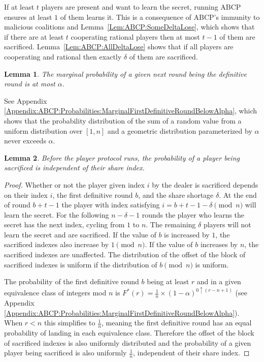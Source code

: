 \documentclass[12pt]{dalcsthesis}
\newtheorem{lemma}{Lemma}
\begin{document}
If at least $t$ players are present and want to learn the secret, running ABCP ensures at least $1$ of them learns it. This is a consequence of ABCP's immunity to malicious coalitions and Lemma~\ref{Lem:ABCP:SomeDeltaLose}, which shows that if there are at least $t$ cooperating rational players then at most $t-1$ of them are sacrificed. Lemma~\ref{Lem:ABCP:AllDeltaLose} shows that if all players are cooperating and rational then exactly $\delta$ of them are sacrificed.

\begin{lemma}\label{Lem:ABPC:MarginalAtMostAlpha}The marginal probability of a given next round being the definitive round is at most $\alpha$.\end{lemma}
See Appendix \ref{Appendix:ABCP:Probabilities:MarginalFirstDefinitiveRoundBelowAlpha}, which shows that the probability distribution of the sum of a random value from a uniform distribution over $[1,n]$ and a geometric distribution parameterized by $\alpha$ never exceeds $\alpha$.

\begin{lemma}\label{Lem:ABCP:FairSacrificeBefore}Before the player protocol runs, the probability of a player being sacrificed is independent of their share index.\end{lemma}
\begin{proof}
Whether or not the player given index $i$ by the dealer is sacrificed depends on their index $i$, the first definitive round $b$, and the share shortage $\delta$. At the end of round $b+t-1$ the player with index satisfying $i = b+t-1-\delta \pmod{n}$ will learn the secret. For the following $n-\delta-1$ rounds the player who learns the secret has the next index, cycling from $1$ to $n$. The remaining $\delta$ players will not learn the secret and are sacrificed. If the value of $b$ is increased by $1$, the sacrificed indexes also increase by $1 \pmod{n}$. If the value of $b$ increases by $n$, the sacrificed indexes are unaffected. The distribution of the offset of the block of sacrificed indexes is uniform if the distribution of $b \pmod{n}$ is uniform.

The probability of the first definitive round $b$ being at least $r$ and in a given equivalence class of integers mod $n$ is $F^{*}(r) = \frac{1}{n} \times (1-\alpha)^{0 \uparrow (r - n + 1)}$ (see Appendix \ref{Appendix:ABCP:Probabilities:MarginalFirstDefinitiveRoundBelowAlpha}). When $r < n$ this simplifies to $\frac{1}{n}$, meaning the first definitive round has an equal probability of landing in each equivalence class. Therefore the offset of the block of sacrificed indexes is also uniformly distributed and the probability of a given player being sacrificed is also uniformly $\frac{1}{n}$, independent of their share index.
\end{proof}
\end{document}

